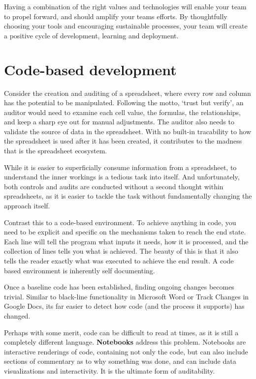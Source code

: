 \documentclass[
]{book}
\begin{document}
Having a combination of the right values and technologies will enable your team to propel forward, and should amplify your teams efforts. By thoughtfully choosing your tools and encouraging sustainable processes, your team will create a positive cycle of development, learning and deployment.

\hypertarget{code-based-development}{%
\section{Code-based development}\label{code-based-development}}

Consider the creation and auditing of a spreadsheet, where every row and column has the potential to be manipulated. Following the motto, `trust but verify', an auditor would need to examine each cell value, the formulas, the relationships, and keep a sharp eye out for manual adjustments. The auditor also needs to validate the source of data in the spreadsheet. With no built-in tracability to how the spreadsheet is used after it has been created, it contributes to the madness that is the spreadsheet ecosystem.

While it is easier to superficially consume information from a spreadsheet, to understand the inner workings is a tedious task into itself. And unfortunately, both controls and audits are conducted without a second thought within spreadsheets, as it is easier to tackle the task without fundamentally changing the approach itself.

Contrast this to a code-based environment. To achieve anything in code, you need to be explicit and specific on the mechanisms taken to reach the end state. Each line will tell the program what inputs it needs, how it is processed, and the collection of lines tells you what is achieved. The beauty of this is that it also tells the reader exactly what was executed to achieve the end result. A code based environment is inherently self documenting.

Once a baseline code has been established, finding ongoing changes becomes trivial. Similar to black-line functionality in Microsoft Word or Track Changes in Google Docs, its far easier to detect how code (and the process it supports) has changed.

Perhaps with some merit, code can be difficult to read at times, as it is still a completely different language. \textbf{Notebooks} address this problem. Notebooks are interactive renderings of code, containing not only the code, but can also include sections of commentary as to why something was done, and can include data visualizations and interactivity. It is the ultimate form of auditability.
\end{document}
